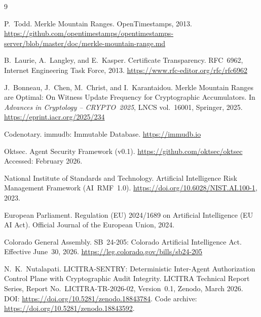 \documentclass{article}
\begin{document}

\begin{thebibliography}{9}

P.~Todd.
\newblock Merkle Mountain Ranges.
\newblock OpenTimestamps, 2013.
\newblock \url{https://github.com/opentimestamps/opentimestamps-server/blob/master/doc/merkle-mountain-range.md}

B.~Laurie, A.~Langley, and E.~Kasper.
\newblock Certificate Transparency.
\newblock RFC~6962, Internet Engineering Task Force, 2013.
\newblock \url{https://www.rfc-editor.org/rfc/rfc6962}

J.~Bonneau, J.~Chen, M.~Christ, and I.~Karantaidou.
\newblock Merkle Mountain Ranges are Optimal: On Witness Update Frequency for
  Cryptographic Accumulators.
\newblock In \textit{Advances in Cryptology -- CRYPTO~2025}, LNCS vol.~16001,
  Springer, 2025.
\newblock \url{https://eprint.iacr.org/2025/234}

Codenotary.
\newblock immudb: Immutable Database.
\newblock \url{https://immudb.io}

Oktsec.
\newblock Agent Security Framework (v0.1).
\newblock \url{https://github.com/oktsec/oktsec}
\newblock Accessed: February 2026.

National Institute of Standards and Technology.
\newblock Artificial Intelligence Risk Management Framework (AI~RMF~1.0).
\newblock \url{https://doi.org/10.6028/NIST.AI.100-1}, 2023.

European Parliament.
\newblock Regulation (EU) 2024/1689 on Artificial Intelligence (EU AI Act).
\newblock Official Journal of the European Union, 2024.

Colorado General Assembly.
\newblock SB~24-205: Colorado Artificial Intelligence Act.
\newblock Effective June~30, 2026.
\newblock \url{https://leg.colorado.gov/bills/sb24-205}

N.~K.~Nutalapati.
\newblock LICITRA-SENTRY: Deterministic Inter-Agent Authorization Control Plane
  with Cryptographic Audit Integrity.
\newblock LICITRA Technical Report Series, Report No.\ LICITRA-TR-2026-02,
  Version~0.1, Zenodo, March 2026.
\newblock DOI: \url{https://doi.org/10.5281/zenodo.18843784}.
\newblock Code archive: \url{https://doi.org/10.5281/zenodo.18843592}.

\end{thebibliography}
\end{document}
